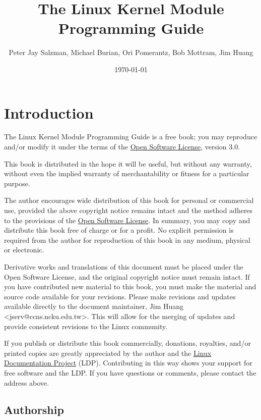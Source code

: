 \documentclass[10pt, oneside]{book}
\author{Peter Jay Salzman, Michael Burian, Ori Pomerantz, Bob Mottram, Jim Huang}
\date{\today}
\title{The Linux Kernel Module Programming Guide}
\begin{document}
\maketitle
\ifdefined\HCode
\else
\tableofcontents
\fi

\section{Introduction}
\label{sec:introduction}
The Linux Kernel Module Programming Guide is a free book; you may reproduce and/or modify it under the terms of the \href{https://opensource.org/licenses/OSL-3.0}{Open Software License}, version 3.0.

This book is distributed in the hope it will be useful, but without any warranty, without even the implied warranty of merchantability or fitness for a particular purpose.

The author encourages wide distribution of this book for personal or commercial use, provided the above copyright notice remains intact and the method adheres to the provisions of the \href{https://opensource.org/licenses/OSL-3.0}{Open Software License}.
In summary, you may copy and distribute this book free of charge or for a profit. No explicit permission is required from the author for reproduction of this book in any medium, physical or electronic.

Derivative works and translations of this document must be placed under the Open Software License, and the original copyright notice must remain intact.
If you have contributed new material to this book, you must make the material and source code available for your revisions.
Please make revisions and updates available directly to the document maintainer, Jim Huang <jserv@ccns.ncku.edu.tw>.
This will allow for the merging of updates and provide consistent revisions to the Linux community.

If you publish or distribute this book commercially, donations, royalties, and/or printed copies are greatly appreciated by the author and the \href{https://tldp.org/}{Linux Documentation Project} (LDP).
Contributing in this way shows your support for free software and the LDP. If you have questions or comments, please contact the address above.

\subsection{Authorship}
\label{sec:authorship}
\end{document}
